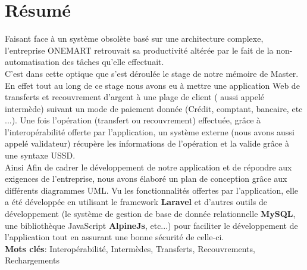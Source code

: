 \chapter*{Résumé}
	\thispagestyle{empty}
	
	
	Faisant face à un système obsolète basé sur une architecture complexe, l'entreprise ONEMART retrouvait sa productivité altérée par le fait de la non-automatisation des tâches qu'elle effectuait.\\
	C'est dans cette optique que s'est déroulée le stage de notre mémoire de Master. En effet tout au long de ce stage nous avons eu à mettre une application Web de transferts et recouvrement d'argent à une plage de client ( aussi appelé intermède) suivant un mode de paiement donnée (Crédit, comptant, bancaire, etc ...). Une fois l'opération (transfert ou recouvrement) effectuée, grâce à l'interopérabilité offerte par l'application, un système externe (nous avons aussi appelé validateur) récupère les informations de l'opération et la valide grâce à une syntaxe USSD.\\
	Ainsi Afin de cadrer le développement de notre application et de répondre aux exigences de l'entreprise, nous avons élaboré un plan de conception grâce aux différents diagrammes UML. Vu les fonctionnalités offertes par l'application, elle a été développée en utilisant le framework \textbf{Laravel} et d'autres outils de développement (le système de gestion de base de donnée relationnelle \textbf{MySQL}, une bibliothèque JavaScript \textbf{AlpineJs}, etc...) pour faciliter le développement de l'application tout en assurant une bonne sécurité de celle-ci.\\
	
	\textbf{Mots clés}: Interopérabilité, Intermèdes, Transferts, Recouvrements, Rechargements
	
%	